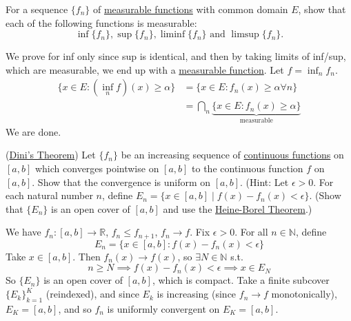   \begin{exercise}[Royden 3.21]
    For a sequence $\{f_n\}$ of \hyperref[def:measurable-function]{measurable functions} with common domain $E$, show that each of the following functions is measurable:
    \begin{equation*}
      \inf \{f_n\}, \sup \{f_n\}, \liminf \{f_n\} \text{ and } \limsup \{f_n\}.
    \end{equation*}
  \end{exercise}
  \begin{solution}
    We prove for inf only since sup is identical, and then by taking limits of inf/sup, which are measurable, we end up with a \hyperref[def:measurable-function]{measurable function}. Let $f = \inf_n f_n$. 
    \begin{align}
      \{x \in E \colon (\inf_n f) (x) \geq \alpha \} & = \{x \in E \colon f_n (x) \geq \alpha \forall n \} \\ 
                                                     & = \bigcap_n \underbrace{\{x \in E \colon f_n (x) \geq \alpha \}}_{\text{measurable}} 
    \end{align}
    We are done. 
  \end{solution}

  \begin{exercise}[Royden 3.22]
    (\hyperref[real-thm:dini]{Dini's Theorem}) Let $\{f_n\}$ be an increasing sequence of \hyperref[pst-def:continuous_func]{continuous functions} on $[a, b]$ which converges pointwise on $[a, b]$ to the continuous function $f$ on $[a, b]$. Show that the convergence is uniform on $[a, b]$. (Hint: Let $\epsilon > 0$. For each natural number $n$, define $E_n = \{x \in [a, b] \mid f(x) - f_n(x) < \epsilon\}$. (Show that $\{E_n\}$ is an open cover of $[a, b]$ and use the \hyperref[pst-thm:heine-borel-theorem]{Heine-Borel Theorem}.)
  \end{exercise}
  \begin{solution}
    We have $f_n : [a, b] \to \mathbb{R}$, $f_n \leq f_{n+1}$, $f_n \to f$. Fix $\epsilon > 0$. For all $n \in \mathbb{N}$, define 
    \begin{equation}
      E_n = \{x \in [a, b] \colon f(x) - f_n (x) < \epsilon \} 
    \end{equation}
    Take $x \in [a, b]$. Then $f_n (x) \to f(x)$, so $\exists N \in \mathbb{N}$ s.t. 
    \begin{equation}
      n \geq N \implies f(x) - f_n (x) < \epsilon \implies x \in E_N 
    \end{equation}
    So $\{E_n\}$ is an open cover of $[a, b]$, which is compact. Take a finite subcover $\{E_k\}_{k=1}^K$ (reindexed), and since $E_k$ is increasing (since $f_n \to f$ monotonically), $E_K = [a, b]$, and so $f_n$ is uniformly convergent on $E_K = [a, b]$. 
  \end{solution}

